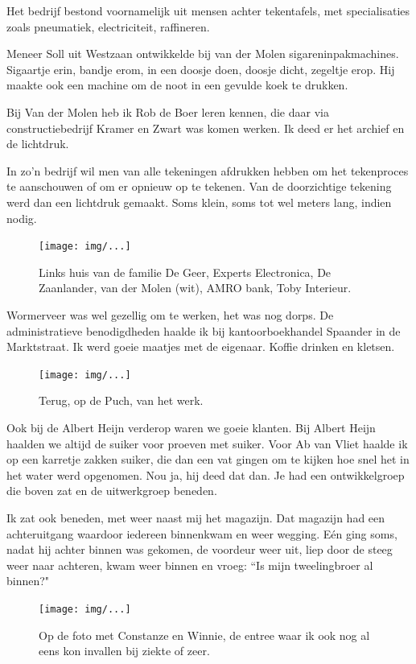 \documentclass[12pt,twoside]{memoir}
\begin{document}
Het bedrijf bestond voornamelijk uit mensen achter tekentafels, met specialisaties zoals pneumatiek, electriciteit, raffineren.

Meneer Soll uit Westzaan ontwikkelde bij van der Molen  sigareninpakmachines. Sigaartje erin, bandje erom, in een doosje doen, doosje dicht, zegeltje erop. Hij maakte ook een machine om de noot in een gevulde koek te drukken. 

Bij Van der Molen heb ik Rob de Boer leren kennen, die daar via constructiebedrijf Kramer en Zwart was komen werken. Ik deed er het archief en de lichtdruk. 

In zo'n bedrijf wil men van alle tekeningen afdrukken hebben om het tekenproces te aanschouwen of om er opnieuw op te tekenen. Van de doorzichtige tekening werd dan een lichtdruk gemaakt. Soms klein, soms tot wel meters lang, indien nodig. 

\begin{figure}[t]
\texttt{[image: img/...]}
\caption{Links huis van de familie De Geer, Experts Electronica, De Zaanlander, van der Molen (wit), AMRO bank, Toby Interieur.}
\end{figure}

Wormerveer was wel gezellig om te werken, het was nog dorps. De administratieve benodigdheden haalde ik bij kantoorboekhandel Spaander in de Marktstraat. Ik werd goeie maatjes met de eigenaar. Koffie drinken en kletsen. 

\begin{figure}[t]
\texttt{[image: img/...]}
\caption{Terug, op de Puch, van het werk.}
\end{figure}

Ook bij de Albert Heijn verderop waren we goeie klanten. Bij Albert Heijn haalden we altijd de suiker voor proeven met suiker. Voor Ab van Vliet haalde ik op een karretje zakken suiker, die dan een vat gingen om te kijken hoe snel het in het water werd opgenomen. Nou ja, hij deed dat dan. Je had een ontwikkelgroep die boven zat en de uitwerkgroep beneden. 

Ik zat ook beneden, met weer naast mij het magazijn. Dat magazijn had een achteruitgang waardoor iedereen binnenkwam en weer wegging. Eén ging soms, nadat hij achter binnen was gekomen, de voordeur weer uit, liep door de steeg weer naar achteren, kwam weer binnen en vroeg: ``Is mijn tweelingbroer al binnen?"

\begin{figure}[t]
\texttt{[image: img/...]}
\caption{Op de foto met Constanze en Winnie, de entree waar ik ook nog al eens kon invallen bij ziekte of zeer.}
\end{figure}
\end{document}

